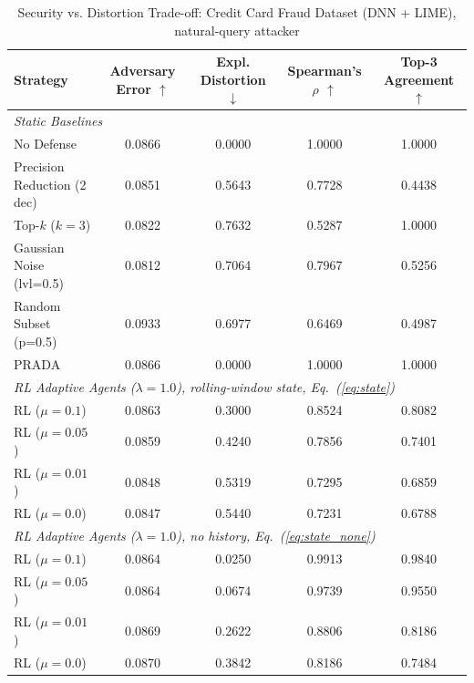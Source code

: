 \documentclass[conference]{IEEEtran}
\DeclareRobustCommand{\rev}[1]{{\color{blue}#1}}
\DeclareRobustCommand{\revnew}[1]{{\color{revpurple}#1}}
\begin{document}
\begin{table}[t]
\caption{Security vs. Distortion Trade-off: Credit Card Fraud Dataset (DNN + LIME)\rev{, natural-query attacker}}
\begin{center}
{\footnotesize
\begin{tabular}{lcccc}
\toprule
\textbf{Strategy} & \textbf{\rev{Adversary Error} $\uparrow$} & \textbf{\rev{Expl. Distortion} $\downarrow$} & \textbf{Spearman's $\rho$ $\uparrow$} & \textbf{Top-3 Agreement $\uparrow$} \\
\midrule
\multicolumn{5}{l}{\textit{Static Baselines}} \\
\rev{No Defense} & \rev{0.0866} & \rev{0.0000} & \rev{1.0000} & \rev{1.0000} \\
\rev{Precision Reduction (2 dec)} & \rev{0.0851} & \rev{0.5643} & \rev{0.7728} & \rev{0.4438} \\
\rev{Top-$k$ ($k=3$)} & \rev{0.0822} & \rev{0.7632} & \rev{0.5287} & \rev{1.0000} \\
\rev{Gaussian Noise (lvl=0.5)} & \rev{0.0812} & \rev{0.7064} & \rev{0.7967} & \rev{0.5256} \\
\rev{Random Subset (p=0.5)} & \rev{0.0933} & \rev{0.6977} & \rev{0.6469} & \rev{0.4987} \\
\rev{PRADA \cite{b17}} & \rev{0.0866} & \rev{0.0000} & \rev{1.0000} & \rev{1.0000} \\
\midrule
\multicolumn{5}{l}{\textit{RL Adaptive Agents ($\lambda=1.0$)\rev{, rolling-window state\revnew{, Eq.~(\ref{eq:state})}}}} \\
\rev{RL ($\mu = 0.1$)} & \rev{0.0863} & \rev{0.3000} & \rev{0.8524} & \rev{0.8082} \\
\rev{RL ($\mu = 0.05$)} & \rev{0.0859} & \rev{0.4240} & \rev{0.7856} & \rev{0.7401} \\
\rev{RL ($\mu = 0.01$)} & \rev{0.0848} & \rev{0.5319} & \rev{0.7295} & \rev{0.6859} \\
\rev{RL ($\mu = 0.0$)} & \rev{0.0847} & \rev{0.5440} & \rev{0.7231} & \rev{0.6788} \\
\midrule
\multicolumn{5}{l}{\rev{\textit{RL Adaptive Agents ($\lambda=1.0$), no history\revnew{, Eq.~(\ref{eq:state_none})}}}} \\
\rev{RL ($\mu = 0.1$)} & \rev{0.0864} & \rev{0.0250} & \rev{0.9913} & \rev{0.9840} \\
\rev{RL ($\mu = 0.05$)} & \rev{0.0864} & \rev{0.0674} & \rev{0.9739} & \rev{0.9550} \\
\rev{RL ($\mu = 0.01$)} & \rev{0.0869} & \rev{0.2622} & \rev{0.8806} & \rev{0.8186} \\
\rev{RL ($\mu = 0.0$)} & \rev{0.0870} & \rev{0.3842} & \rev{0.8186} & \rev{0.7484} \\
\bottomrule
\end{tabular}
}
\label{tab_credit}
\end{center}
\end{table}
\end{document}
